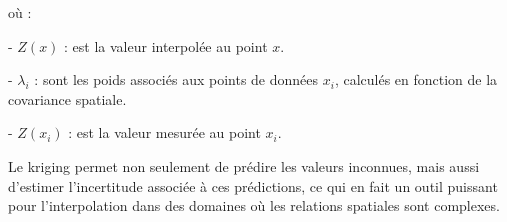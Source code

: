 où :

- \( Z(x) \) : est la valeur interpolée au point \( x \).

\vspace{-0,2 cm}

- \( \lambda_i \) : sont les poids associés aux points de données \( x_i \), calculés en fonction de la covariance spatiale.

\vspace{-0,2 cm}

- \( Z(x_i) \) : est la valeur mesurée au point \( x_i \).

Le kriging permet non seulement de prédire les valeurs inconnues, mais aussi d'estimer l'incertitude associée à ces prédictions, ce qui en fait un outil puissant pour l'interpolation dans des domaines où les relations spatiales sont complexes.




